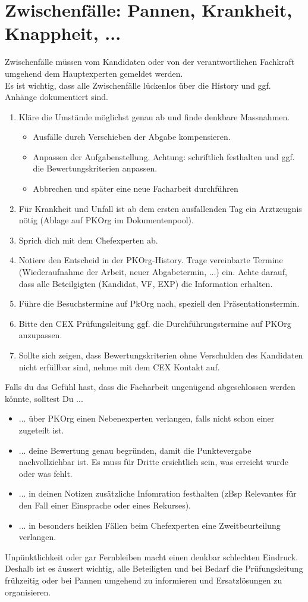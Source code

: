 \section{Zwischenfälle: Pannen, Krankheit, Knappheit, ...}
Zwischenfälle müssen vom Kandidaten oder von der verantwortlichen Fachkraft umgehend dem Hauptexperten gemeldet werden.\\Es ist wichtig, dass alle Zwischenfälle lückenlos über die History und ggf. Anhänge dokumentiert sind.

\begin{enumerate}
  \item Kläre die Umstände möglichst genau ab und finde denkbare Massnahmen.
  \begin{itemize}
    \item Ausfälle durch Verschieben der Abgabe kompensieren.
    \item Anpassen der Aufgabenstellung. Achtung: schriftlich festhalten und ggf. die Bewertungskriterien anpassen.
    \item Abbrechen und später eine neue Facharbeit durchführen
  \end{itemize}
  \item Für Krankheit und Unfall ist ab dem ersten ausfallenden Tag ein Arztzeugnis nötig (Ablage auf PKOrg im Dokumentenpool).
  \item Sprich dich mit dem Chefexperten ab.
  \item Notiere den Entscheid in der PKOrg-History. Trage vereinbarte Termine (Wiederaufnahme der Arbeit, neuer Abgabetermin, ...) ein. Achte darauf, dass alle Beteilgigten (Kandidat, VF, EXP) die Information erhalten.
  \item Führe die Besuchstermine auf PkOrg nach, speziell den Präsentationstermin.
  \item Bitte den CEX Prüfungsleitung ggf. die Durchführungstermine auf PKOrg
  anzupassen.
  \item Sollte sich zeigen, dass Bewertungskriterien ohne Verschulden des Kandidaten nicht erfüllbar sind, nehme mit dem CEX Kontakt auf.
\end{enumerate}

Falls du das Gefühl hast, dass die Facharbeit ungenügend abgeschlossen werden könnte, solltest Du ...
\begin{itemize}
  \item ... über PKOrg einen Nebenexperten verlangen, falls nicht schon einer zugeteilt ist.
  \item ... deine Bewertung genau begründen, damit die Punktevergabe nachvollziehbar ist. Es muss für Dritte ersichtlich sein, was erreicht wurde oder was fehlt.
  \item ... in deinen Notizen zusätzliche Infomration festhalten (zBsp Relevantes für den Fall einer Einsprache oder eines Rekurses). 
  \item ... in besonders heiklen Fällen beim Chefexperten eine Zweitbeurteilung verlangen.

\end{itemize}

Unpünktlichkeit oder gar Fernbleiben macht einen denkbar schlechten Eindruck. Deshalb ist es äussert wichtig, alle Beteiligten und bei Bedarf die Prüfungsleitung frühzeitig oder bei Pannen umgehend zu informieren und Ersatzlösungen zu organisieren.
